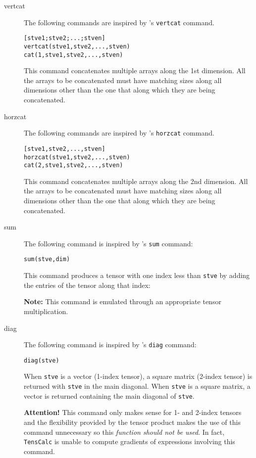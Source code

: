 \documentclass[11pt]{article}
\newcommand{\TC}{\texttt{TensCalc}}
\theoremstyle{remark}
\begin{document}
\begin{description}
\item[vertcat] The following commands are inspired by \matlab's
  \lstinline{vertcat} command.
\begin{lstlisting}
[stve1;stve2;...;stven]
vertcat(stve1,stve2,...,stven)
cat(1,stve1,stve2,...,stven)
\end{lstlisting}
  This command concatenates multiple arrays along the 1st
  dimension. All the arrays to be concatenated must have matching
  sizes along all dimensions other than the one that along which they
  are being concatenated.

\item[horzcat] The following commands are inspired by \matlab's
  \lstinline{horzcat} command.
\begin{lstlisting}
[stve1,stve2,...,stven]
horzcat(stve1,stve2,...,stven)
cat(2,stve1,stve2,...,stven)
\end{lstlisting}
  This command concatenates multiple arrays along the 2nd
  dimension. All the arrays to be concatenated must have matching
  sizes along all dimensions other than the one that along which they
  are being concatenated.

\item[sum] The following command is inspired by \matlab's
  \lstinline{sum} command:
\begin{lstlisting}
sum(stve,dim)
\end{lstlisting}
  This command produces a tensor with one index less than \lstinline{stve} by
  adding the entries of the tensor along that index:
  
  \textbf{Note:} This command is emulated through an appropriate
  tensor multiplication.
 

\item[diag] The following command is inspired by \matlab's
  \lstinline{diag} command:
\begin{lstlisting}
diag(stve)
\end{lstlisting}
  When \lstinline{stve} is a vector (1-index tensor), a square matrix
  (2-index tensor) is returned with \lstinline{stve} in the main
  diagonal. When \lstinline{stve} is a square matrix, a vector is
  returned containing the main diagonal of \lstinline{stve}.

  \textbf{Attention!} This command only makes sense for 1- and 2-index
  tensors and the flexibility provided by the tensor product makes the
  use of this command unnecessary so this \emph{function should not be
    used}. In fact, \TC{} is unable to compute gradients of
  expressions involving this command.


\end{description}
\end{document}
